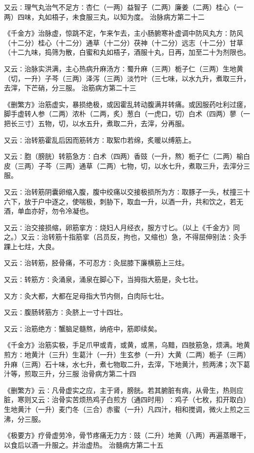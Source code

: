 \documentclass[a4paper,12pt,UTF8,twoside]{ctexbook}
\begin{document}
又云∶理气丸治气不足方∶杏仁（一两）益智子（二两）廉姜（二两）桂心（一两）四味，丸如梧子，未食服三丸，以知为度。
治脉病方第二十二

《千金方》治脉虚，惊跳不定，乍来乍去，主小肠腑寒补虚调中防风丸方∶防风（十二分）桂心（十二分）通草（十二分）茯神（十二分）远志（十二分）甘草（十二九味，捣筛为散，白蜜和丸如梧子，酒服十丸，日再，加至二十为剂限也。

又云∶治脉实洪满，主心热病升麻汤方∶蜀升麻（三两）栀子仁（三两）生地黄（切，一升）子芩（三两）泽泻（三两）淡竹叶（三七味，以水九升，煮取三升，去滓，下芒硝，分三服。
治筋病方第二十三

《删繁方》治筋虚实，暴损绝极，或因霍乱转动腹满并转痛。或因服药吐利过瘥，脚手虚转人参（二两）浓朴（二两，炙）葱白（一虎口，切）白术（四两）蓼（一把长三寸）五物，切，以水五升，煮取二升，去滓，分再服。

又云∶治转筋霍乱后因而筋转方∶取絮巾若绵，炙暖以缚筋上。

又云∶胞（膀胱）转筋急方∶白术（四两）香豉（一升，熬）栀子仁（二两）榆白皮（三两）子芩（三两）通草（二两）七物，切，以水七升，煮取三升，去滓分三服。

又云∶治转筋阴囊卵缩入腹，腹中绞痛以交接极损所为方∶取豚子一头，杖撞三十六下，放于户中逐之，使喘极，刺胁下，取血一升，以酒一升，共和饮之，若无酒，单血亦好，勿令冷凝也。

又云∶治交接损缩，卵筋挛方∶烧妇人月经衣，服方寸匕。（以上《千金方》同之。）又云∶治转筋十指筋挛（吕员反，拘也，又缩也）急，不得屈伸别法∶灸手踝上七炷，大良。

又云∶治转筋，胫骨痛，不可忍方∶灸屈膝下廉横筋上三炷。

又云∶转筋方∶灸涌泉，涌泉在脚心下，当拇指大筋是，灸七壮。

又方∶灸大都，大都在足母指大节内侧，白肉际七壮。

又云∶腹肠转筋方∶灸脐上一寸十四壮。

又云∶治筋绝方∶蟹脑足髓熬，纳疮中，筋即续矣。

《千金方》治筋实极，手足爪甲或青，或黄，或黑，乌黯，四肢筋急，烦满。地黄煎方∶地黄汁（三升）生葛汁（一升）生玄参（一升）大黄（二两）栀子（三两）升麻（三两）石十味，水七升，煮七物取二升，去滓，下地黄汁，煎两沸；次下葛汁等，煎取三升，分三服
治骨病方第二十四

《删繁方》云∶凡骨虚实之应，主于肾，膀胱。若其腑脏有病，从骨生，热则应脏，寒则又云∶治骨实苦烦热鸡子白煎方（通四时用）∶鸡子（七枚，扣开取白）生地黄汁（一升）麦门冬（三合）赤蜜（一升）凡四汁，相和搅调，微火上煎之三沸，分三服。

《极要方》疗骨虚劳冷，骨节疼痛无力方∶豉（二升）地黄（八两）再遍蒸曝干，以食后以酒一升服之。并治虚热。
治髓病方第二十五
\end{document}
